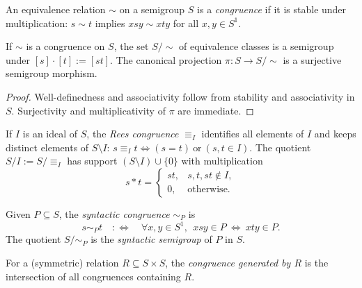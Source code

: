 \begin{definition}
\label{def:congruence}
An equivalence relation \(\sim\) on a semigroup \(S\) is a \emph{congruence} if it is stable under multiplication: \(s\sim t\) implies \(x s y \sim x t y\) for all \(x,y\in S^1\).
\end{definition}

\begin{lemma}
\label{lem:quotient-by-congruence}
If \(\sim\) is a congruence on \(S\), the set \(S/{\sim}\) of equivalence classes is a semigroup under \([s]\cdot [t]:=[st]\). The canonical projection \(\pi:S\to S/{\sim}\) is a surjective semigroup morphism.
\end{lemma}
\begin{proof}
Well-definedness and associativity follow from stability and associativity in \(S\). Surjectivity and multiplicativity of \(\pi\) are immediate.
\end{proof}

\begin{definition}
\label{def:rees-congruence}
If \(I\) is an ideal of \(S\), the \emph{Rees congruence} \(\equiv_I\) identifies all elements of \(I\) and keeps distinct elements of \(S\setminus I\): \(s\equiv_I t\iff (s=t)\ \text{or}\ (s,t\in I)\). The quotient \(S/I:=S/{\equiv_I}\) has support \((S\setminus I)\cup\{0\}\) with multiplication
\[
s\ast t=\begin{cases}
st,& s,t,st\notin I,\\[2pt]
0,& \text{otherwise.}
\end{cases}
\]
\end{definition}

\begin{definition}
\label{def:syntactic-congruence}
Given \(P\subseteq S\), the \emph{syntactic congruence} \(\sim_P\) is
\[
s\sim_P t\quad:\Longleftrightarrow\quad \forall x,y\in S^1,\ \ x s y\in P\ \Leftrightarrow\ x t y\in P.
\]
The quotient \(S/{\sim_P}\) is the \emph{syntactic semigroup} of \(P\) in \(S\).
\end{definition}

\begin{definition}
\label{def:generated-congruence}
For a (symmetric) relation \(R\subseteq S\times S\), the \emph{congruence generated by \(R\)} is the intersection of all congruences containing \(R\).
\end{definition}

